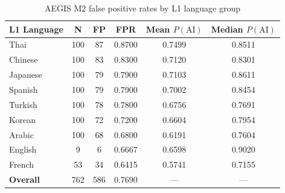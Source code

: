 \begin{table}[ht]
\centering
\caption{AEGIS M2 false positive rates by L1 language group}
\label{tab:fairness}
\begin{tabular}{lccccc}
\hline
\textbf{L1 Language} & \textbf{N} & \textbf{FP} & \textbf{FPR} & \textbf{Mean $P(\text{AI})$} & \textbf{Median $P(\text{AI})$} \\
\hline
Thai & 100 & 87 & 0.8700 & 0.7499 & 0.8511 \\
Chinese & 100 & 83 & 0.8300 & 0.7120 & 0.8301 \\
Japanese & 100 & 79 & 0.7900 & 0.7103 & 0.8611 \\
Spanish & 100 & 79 & 0.7900 & 0.7002 & 0.8454 \\
Turkish & 100 & 78 & 0.7800 & 0.6756 & 0.7691 \\
Korean & 100 & 72 & 0.7200 & 0.6604 & 0.7954 \\
Arabic & 100 & 68 & 0.6800 & 0.6191 & 0.7604 \\
English & 9 & 6 & 0.6667 & 0.6598 & 0.9020 \\
French & 53 & 34 & 0.6415 & 0.5741 & 0.7155 \\
\hline
\textbf{Overall} & 762 & 586 & 0.7690 & — & — \\
\hline
\end{tabular}
\end{table}